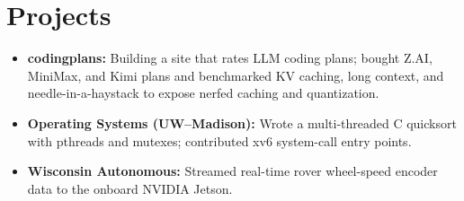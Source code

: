 \documentclass[11pt, letterpaper]{article}
\begin{document}
\section{Projects}
\begin{itemize}
  \item \textbf{codingplans:} Building a site that rates LLM coding plans; bought Z.AI, MiniMax, and Kimi plans and benchmarked KV caching, long context, and needle-in-a-haystack to expose nerfed caching and quantization.
  \item \textbf{Operating Systems (UW--Madison):} Wrote a multi-threaded C quicksort with pthreads and mutexes; contributed xv6 system-call entry points.
  \item \textbf{Wisconsin Autonomous:} Streamed real-time rover wheel-speed encoder data to the onboard NVIDIA Jetson.
\end{itemize}
\end{document}
